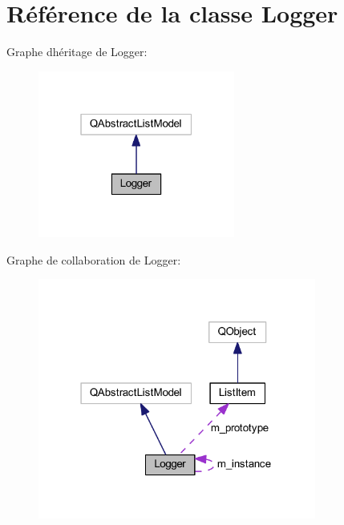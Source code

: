 \hypertarget{class_logger}{}\section{Référence de la classe Logger}
\label{class_logger}


Graphe d\textquotesingle{}héritage de Logger\+:
\nopagebreak
\begin{figure}[H]
\begin{center}
\leavevmode
\includegraphics[width=183pt]{class_logger__inherit__graph}
\end{center}
\end{figure}


Graphe de collaboration de Logger\+:
\nopagebreak
\begin{figure}[H]
\begin{center}
\leavevmode
\includegraphics[width=259pt]{class_logger__coll__graph}
\end{center}
\end{figure}
